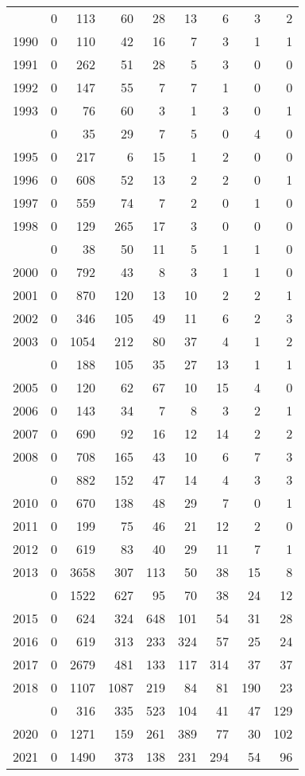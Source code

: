 \documentclass[
]{article}
\begin{document}
\begin{longtable}[t]{lrrrrrrrr}
\endfoot
\bottomrule
\endlastfoot
1989 & 0 & 113 & 60 & 28 & 13 & 6 & 3 & 2\\
1990 & 0 & 110 & 42 & 16 & 7 & 3 & 1 & 1\\
1991 & 0 & 262 & 51 & 28 & 5 & 3 & 0 & 0\\
1992 & 0 & 147 & 55 & 7 & 7 & 1 & 0 & 0\\
1993 & 0 & 76 & 60 & 3 & 1 & 3 & 0 & 1\\
\addlinespace
1994 & 0 & 35 & 29 & 7 & 5 & 0 & 4 & 0\\
1995 & 0 & 217 & 6 & 15 & 1 & 2 & 0 & 0\\
1996 & 0 & 608 & 52 & 13 & 2 & 2 & 0 & 1\\
1997 & 0 & 559 & 74 & 7 & 2 & 0 & 1 & 0\\
1998 & 0 & 129 & 265 & 17 & 3 & 0 & 0 & 0\\
\addlinespace
1999 & 0 & 38 & 50 & 11 & 5 & 1 & 1 & 0\\
2000 & 0 & 792 & 43 & 8 & 3 & 1 & 1 & 0\\
2001 & 0 & 870 & 120 & 13 & 10 & 2 & 2 & 1\\
2002 & 0 & 346 & 105 & 49 & 11 & 6 & 2 & 3\\
2003 & 0 & 1054 & 212 & 80 & 37 & 4 & 1 & 2\\
\addlinespace
2004 & 0 & 188 & 105 & 35 & 27 & 13 & 1 & 1\\
2005 & 0 & 120 & 62 & 67 & 10 & 15 & 4 & 0\\
2006 & 0 & 143 & 34 & 7 & 8 & 3 & 2 & 1\\
2007 & 0 & 690 & 92 & 16 & 12 & 14 & 2 & 2\\
2008 & 0 & 708 & 165 & 43 & 10 & 6 & 7 & 3\\
\addlinespace
2009 & 0 & 882 & 152 & 47 & 14 & 4 & 3 & 3\\
2010 & 0 & 670 & 138 & 48 & 29 & 7 & 0 & 1\\
2011 & 0 & 199 & 75 & 46 & 21 & 12 & 2 & 0\\
2012 & 0 & 619 & 83 & 40 & 29 & 11 & 7 & 1\\
2013 & 0 & 3658 & 307 & 113 & 50 & 38 & 15 & 8\\
\addlinespace
2014 & 0 & 1522 & 627 & 95 & 70 & 38 & 24 & 12\\
2015 & 0 & 624 & 324 & 648 & 101 & 54 & 31 & 28\\
2016 & 0 & 619 & 313 & 233 & 324 & 57 & 25 & 24\\
2017 & 0 & 2679 & 481 & 133 & 117 & 314 & 37 & 37\\
2018 & 0 & 1107 & 1087 & 219 & 84 & 81 & 190 & 23\\
\addlinespace
2019 & 0 & 316 & 335 & 523 & 104 & 41 & 47 & 129\\
2020 & 0 & 1271 & 159 & 261 & 389 & 77 & 30 & 102\\
2021 & 0 & 1490 & 373 & 138 & 231 & 294 & 54 & 96\\*
\end{longtable}
\end{document}
